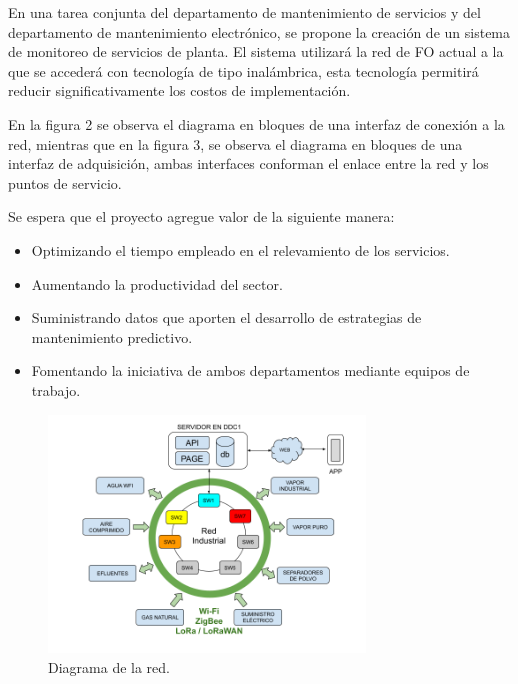 \documentclass[
11pt, %
]{charter}
\begin{document}
En una tarea conjunta del departamento de mantenimiento de servicios y del departamento de mantenimiento electrónico, se propone la creación de un sistema de monitoreo de servicios de planta. El sistema utilizará la red de FO actual a la que se accederá con tecnología de tipo inalámbrica, esta tecnología permitirá reducir significativamente los costos de implementación.

En la figura 2 se observa el diagrama en bloques de una interfaz de conexión a la red, mientras que en la figura 3, se observa el diagrama en bloques de una interfaz de adquisición, ambas interfaces conforman el enlace entre la red y los puntos de servicio. 

Se espera que el proyecto agregue valor de la siguiente manera:
\begin{itemize}
	\item Optimizando el tiempo empleado en el relevamiento de los servicios.
	\item Aumentando la productividad del sector.
	\item Suministrando datos que aporten el desarrollo de estrategias de mantenimiento predictivo.
	\item Fomentando la iniciativa de ambos departamentos mediante equipos de trabajo.
\end{itemize}



\begin{figure}[htpb]
\centering 
\includegraphics[width=0.75\textwidth]{./Figuras/diagrama_red_cel.png}
\caption{Diagrama de la red.}
\label{fig:diagBloques}
\end{figure}
\end{document}
